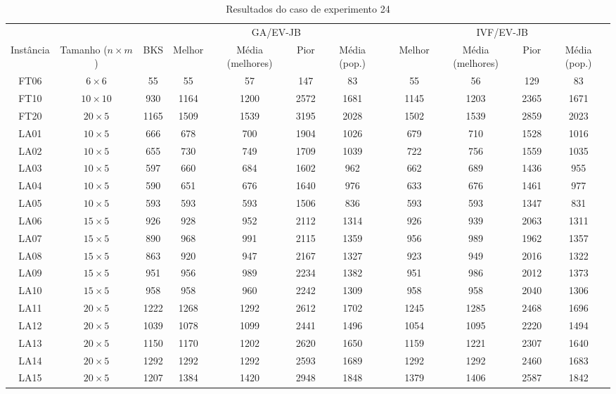\begin{sidewaystable}
\caption{Resultados do caso de experimento 24}
\centering
\label{experimento24}
\begin{tabular}{cccccccccccc}
\toprule
& & & \multicolumn{4}{c}{GA/EV-JB} & & \multicolumn{4}{c}{IVF/EV-JB} \\
\cmidrule(c){4-7}
\cmidrule(c){9-12}
Inst\^{a}ncia & Tamanho ($n \times m$) & BKS & Melhor & M\'{e}dia (melhores) & Pior & M\'{e}dia (pop.) & & Melhor & M\'{e}dia (melhores) & Pior & M\'{e}dia (pop.) \\
\midrule
FT06 & $6 \times 6$ & 55 & 55 & 57 & 147 & 83 & & 55 & 56 & 129 & 83 \\
FT10 & $10 \times 10$ & 930 & 1164 & 1200 & 2572 & 1681 & & 1145 & 1203 & 2365 & 1671 \\
FT20 & $20 \times 5$ & 1165 & 1509 & 1539 & 3195 & 2028 & & 1502 & 1539 & 2859 & 2023 \\
LA01 & $10 \times 5$ & 666 & 678 & 700 & 1904 & 1026 & & 679 & 710 & 1528 & 1016 \\
LA02 & $10 \times 5$ & 655 & 730 & 749 & 1709 & 1039 & & 722 & 756 & 1559 & 1035 \\
LA03 & $10 \times 5$ & 597 & 660 & 684 & 1602 & 962 & & 662 & 689 & 1436 & 955 \\
LA04 & $10 \times 5$ & 590 & 651 & 676 & 1640 & 976 & & 633 & 676 & 1461 & 977 \\
LA05 & $10 \times 5$ & 593 & 593 & 593 & 1506 & 836 & & 593 & 593 & 1347 & 831 \\
LA06 & $15 \times 5$ & 926 & 928 & 952 & 2112 & 1314 & & 926 & 939 & 2063 & 1311 \\
LA07 & $15 \times 5$ & 890 & 968 & 991 & 2115 & 1359 & & 956 & 989 & 1962 & 1357 \\
LA08 & $15 \times 5$ & 863 & 920 & 947 & 2167 & 1327 & & 923 & 949 & 2016 & 1322 \\
LA09 & $15 \times 5$ & 951 & 956 & 989 & 2234 & 1382 & & 951 & 986 & 2012 & 1373 \\
LA10 & $15 \times 5$ & 958 & 958 & 960 & 2242 & 1309 & & 958 & 958 & 2040 & 1306 \\
LA11 & $20 \times 5$ & 1222 & 1268 & 1292 & 2612 & 1702 & & 1245 & 1285 & 2468 & 1696 \\
LA12 & $20 \times 5$ & 1039 & 1078 & 1099 & 2441 & 1496 & & 1054 & 1095 & 2220 & 1494 \\
LA13 & $20 \times 5$ & 1150 & 1170 & 1202 & 2620 & 1650 & & 1159 & 1221 & 2307 & 1640 \\
LA14 & $20 \times 5$ & 1292 & 1292 & 1292 & 2593 & 1689 & & 1292 & 1292 & 2460 & 1683 \\
LA15 & $20 \times 5$ & 1207 & 1384 & 1420 & 2948 & 1848 & & 1379 & 1406 & 2587 & 1842 \\
\bottomrule
\end{tabular}
\end{sidewaystable}
